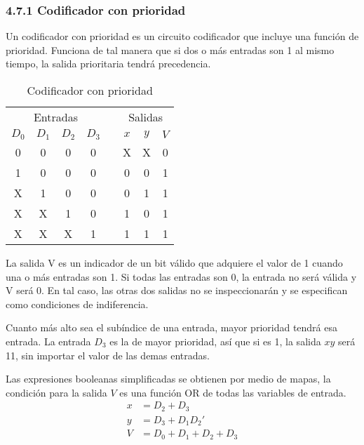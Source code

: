 \subsubsection*{4.7.1 Codificador con prioridad}
Un codificador con prioridad es un circuito codificador que incluye una funci\'{o}n de prioridad. Funciona
de tal manera que si dos o m\'{a}s entradas son 1 al mismo tiempo, la salida prioritaria tendr\'{a} precedencia.

\begin{table}[h]
    \centering
    \begin{tabular}{cccc c ccc}
        \toprule
        \multicolumn{4}{c}{Entradas} &       & \multicolumn{3}{c}{Salidas}                              \\
        \cmidrule{1-4} \cmidrule{6-8}
        $D_0$                        & $D_1$ & $D_2$                       & $D_3$ &  & $x$ & $y$ & $V$ \\
        \midrule
        0                            & 0     & 0                           & 0     &  & X   & X   & 0   \\
        1                            & 0     & 0                           & 0     &  & 0   & 0   & 1   \\
        X                            & 1     & 0                           & 0     &  & 0   & 1   & 1   \\
        X                            & X     & 1                           & 0     &  & 1   & 0   & 1   \\
        X                            & X     & X                           & 1     &  & 1   & 1   & 1   \\
        \bottomrule
    \end{tabular}
    \caption{Codificador con prioridad}
\end{table}

La salida V es un indicador de un bit v\'{a}lido  que adquiere el valor de 1 cuando una o m\'{a}s entradas son 1.
Si todas las entradas son 0, la entrada no ser\'{a} v\'{a}lida y V ser\'{a} 0. En tal caso, las otras dos salidas
no se inspeccionar\'{a}n y se especifican como condiciones de indiferencia.

Cuanto m\'{a}s alto sea el sub\'{i}ndice de una entrada, mayor prioridad tendr\'{a} esa entrada. La entrada $D_3$
es la de mayor prioridad, as\'{i} que si es 1, la salida $xy$ ser\'{a} 11, sin importar el valor de las demas entradas.

Las expresiones booleanas simplificadas se obtienen por medio de mapas, la condici\'{o}n para la salida $V$ es una funci\'{o}n
OR de todas las variables de entrada.
\begin{align*}
    x & = D_2 + D_3             \\
    y & = D_3 + D_1D_2'         \\
    V & = D_0 + D_1 + D_2 + D_3
\end{align*}

